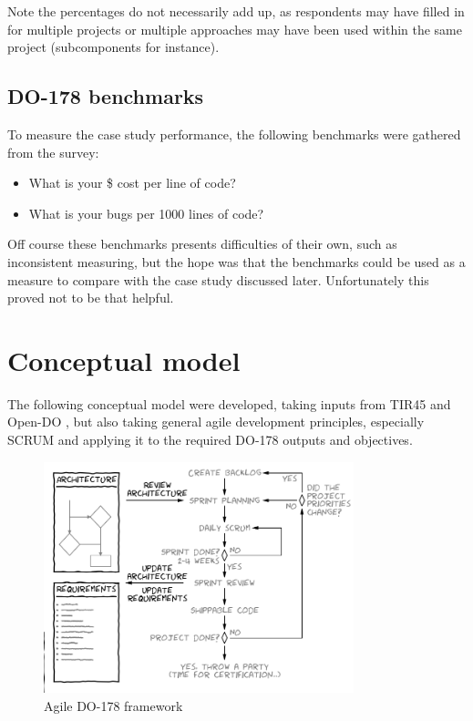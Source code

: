 \documentclass{sig-alternate-05-2015}
\begin{document}
Note the percentages do not necessarily add up, as respondents may have filled in for multiple projects or multiple approaches may have been used within the same project (subcomponents for instance).    

\subsection{DO-178 benchmarks}
To measure the case study performance, the following benchmarks were gathered from the survey:

\begin{itemize}
	\item What is your \$ cost per line of code?
	\item What is your bugs per 1000 lines of code?
\end{itemize}

Off course these benchmarks presents difficulties of their own, such as inconsistent measuring, but the hope was that the benchmarks could be used as a measure to compare with the case study discussed later. Unfortunately this proved not to be that helpful.

\section{Conceptual model}

The following conceptual model were developed, taking inputs from TIR45 \cite{AAMI_TIR45_2012} and Open-DO \cite{OPEN-DO_2010}, but also taking general agile development principles, especially SCRUM and applying it to the required DO-178 outputs and objectives.

\begin{figure}[t!]
	\centering 
	\includegraphics[width=90mm]{DO178_scrum.png}
	\caption{Agile DO-178 framework}
\end{figure}
\end{document}
